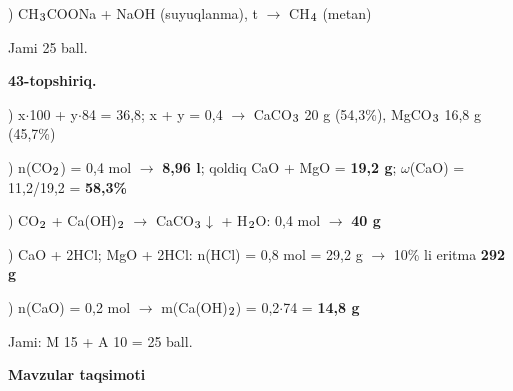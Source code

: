 \documentclass[11pt,a4paper]{article}
\renewcommand{\textsubscript}[1]{\ensuremath{_{\text{\fontsize{8}{8}\selectfont #1}}}}
\begin{document}
) CH\textsubscript{3}COONa + NaOH (suyuqlanma), t\textdegree{} $\to$ CH\textsubscript{4} (metan)\par
\noindent Jami 25 ball.\par
\noindent\textbf{43-topshiriq.}\par
{}) x$\cdot$100 + y$\cdot$84 = 36,8; x + y = 0,4 $\to$ CaCO\textsubscript{3} 20 g (54,3\%), MgCO\textsubscript{3} 16,8 g (45,7\%)\par
{}) n(CO\textsubscript{2}) = 0,4 mol $\to$ \textbf{8,96 l}; qoldiq CaO + MgO = \textbf{19,2 g}; $\omega$(CaO) = 11,2/19,2 = \textbf{58,3\%}\par
{}) CO\textsubscript{2} + Ca(OH)\textsubscript{2} $\to$ CaCO\textsubscript{3}$\downarrow$ + H\textsubscript{2}O: 0,4 mol $\to$ \textbf{40 g}\par
{}) CaO + 2HCl; MgO + 2HCl: n(HCl) = 0,8 mol = 29,2 g $\to$ 10\% li eritma \textbf{292 g}\par
{}) n(CaO) = 0,2 mol $\to$ m(Ca(OH)\textsubscript{2}) = 0,2$\cdot$74 = \textbf{14,8 g}\par
\noindent Jami: M 15 + A 10 = 25 ball.\par
\par\bigskip\noindent\textbf{Mavzular taqsimoti}\par\smallskip
\end{document}
